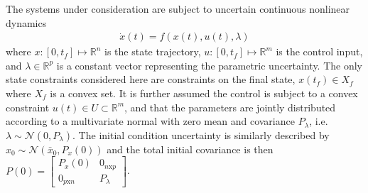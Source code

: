 \documentclass[10pt,a4paper]{article}
\begin{document}
	The systems under consideration are subject to uncertain continuous nonlinear dynamics 
	\begin{align}
	\dot{x}(t) = f(x(t),u(t),\lambda)
	\end{align}
	where $x:[0,t_f]\mapsto \mathbb{R}^n$ is the state trajectory, $u:[0,t_f]\mapsto \mathbb{R}^m$ is the control input, and $\lambda\in\mathbb{R}^p$ is a constant vector representing the parametric uncertainty. The only state constraints considered here are constraints on the final state, $x(t_f)\in X_f$ where $X_f$ is a convex set. It is further assumed the control is subject to a convex constraint $u(t) \in U \subset \mathbb{R}^m$, and that the parameters are jointly distributed according to a multivariate normal with zero mean and covariance $P_{\lambda}$, i.e. $\lambda \sim \mathcal{N}(0,P_{\lambda})$. The initial condition uncertainty is similarly described by $x_0 \sim \mathcal{N}(\bar{x}_0,P_x(0))$ and the total initial covariance is then $P(0) = \left[\begin{array}{cc}
		P_{x}(0)& 0_{n\mathrm{x}p} \\
		 0_{p\mathrm{x}n} & P_{\lambda}
		\end{array}\right]$.
	
\end{document}
